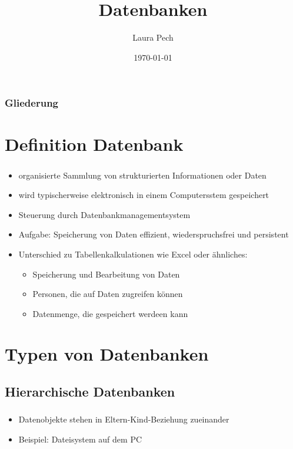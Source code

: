 \documentclass[aspectratio=169,14pt,xcolor=dvipsnames]{beamer}
\title{Datenbanken}
\author[]{Laura Pech}
\institute{Unitedprint.com SE\\Auszubildende Fachinformatikerin für Anwendungsentwicklung}
\date{\today}
\begin{document}
\maketitle

\begin{frame}[t]
    \frametitle{Gliederung}
    \hypersetup{linkcolor=black}
    \tableofcontents%
\end{frame}

\section{Definition Datenbank}

\begin{frame}[t]
    \frametitle{\secname}
    \begin{itemize}
        \item organisierte Sammlung von strukturierten Informationen oder Daten
        \item wird typischerweise elektronisch in einem Computersstem gespeichert
        \item Steuerung durch Datenbankmanagementsystem
        \item Aufgabe: Speicherung von Daten effizient, wiederspruchsfrei und persistent
        \item Unterschied zu Tabellenkalkulationen wie Excel oder ähnliches:
        \begin{itemize}
            \item Speicherung und Bearbeitung von Daten
            \item Personen, die auf Daten zugreifen können
            \item Datenmenge, die gespeichert werdeen kann
        \end{itemize}
    \end{itemize}
\end{frame}

\section{Typen von Datenbanken}

\subsection{Hierarchische Datenbanken}
\begin{frame}[t]
    \frametitle{\secname}
    \framesubtitle{\subsecname}
    \begin{itemize}
        \item Datenobjekte stehen in Eltern-Kind-Beziehung zueinander
        \item Beispiel: Dateisystem auf dem PC
    \end{itemize}
\end{frame}
\end{document}
